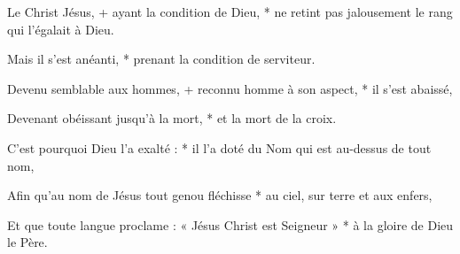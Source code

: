 \item Le Christ Jésus, +
ayant la condition de Dieu, *
ne retint pas jalousement
le rang qui l'égalait à Dieu.

\item Mais il s'est anéanti, *
prenant la condition de serviteur.

\item Devenu semblable aux hommes, +
reconnu homme à son aspect, *
il s'est abaissé,

\item Devenant obéissant jusqu'à la mort, *
et la mort de la croix.

\item C'est pourquoi Dieu l'a exalté : *
il l'a doté du Nom
qui est au-dessus de tout nom,

\item Afin qu'au nom de Jésus
tout genou fléchisse *
au ciel, sur terre et aux enfers,

\item Et que toute langue proclame :
« Jésus Christ est Seigneur » *
à la gloire de Dieu le Père.